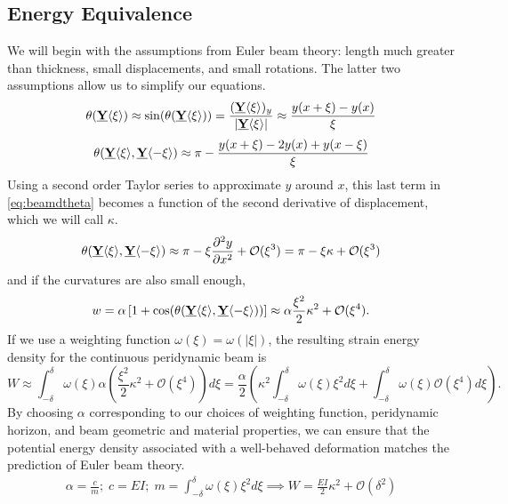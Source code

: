 \documentclass[11pt]{amsart}
\newcommand\vstate[3]{%
	\mathbf{\underline{#1}}%
	\ifstrempty{#2}{}{[#2]}%
	\ifstrempty{#3}{}{\langle #3 \rangle}}
\begin{document}
\subsection{Energy Equivalence}
%
We will begin with the assumptions from Euler beam theory: length much greater than thickness, small displacements, and small rotations. 
The latter two assumptions allow us to simplify our equations. 
%
\begin{equation}
\label{eq:beam}
\theta(\vstate{Y}{}{\xi})\approx \sin(\theta(\vstate{Y}{}{\xi})) = \frac{(\vstate{Y}{}{\xi})_y}{|\vstate{Y}{}{\xi}|} \approx \frac{y(x+\xi)-y(x)}{\xi}
\end{equation}
%
\begin{equation}
\label{eq:beamdtheta}
\theta(\vstate{Y}{}{\xi},\vstate{Y}{}{\mathbf{-\xi}}) \approx \pi-\frac{y(x+\xi)-2y(x)+y(x-\xi)}{\xi}
\end{equation}
%
Using a second order Taylor series to approximate $y$ around $x$, this last term in \cref{eq:beamdtheta} becomes a function of the second derivative of displacement, which we will call \(\kappa\).
%
\begin{equation}
\label{eq:beamdtheta2}
\theta(\vstate{Y}{}{\xi},\vstate{Y}{}{\mathbf{-\xi}}) \approx \pi-\xi \frac{\partial^2 y}{\partial x^2}+\mathcal{O}(\xi^3) =  \pi-\xi \kappa+\mathcal{O}(\xi^3) 
\end{equation}
%
and if the curvatures are also small enough,
%
\begin{align}
\label{eq:continuousBeamw}
w = \alpha \left[1+\cos(\theta(\vstate{Y}{}{\xi},\vstate{Y}{}{\mathbf{-\xi}})) \right] \approx \alpha\frac{\xi^2}{2}\kappa^2 +\mathcal{O}(\xi^4) .
\end{align}
%
If we use a weighting function \(\omega(\xi)=\omega(|\xi|)\), the resulting strain energy density for the continuous peridynamic beam is
%
\begin{equation}
W \approx \int_{-\delta}^\delta \omega(\xi)\alpha\left(\frac{\xi^2}{2}\kappa^2 +\mathcal{O}(\xi^4)\right) d\xi = \frac{\alpha}{2}\left(\kappa^2 \int_{-\delta}^\delta \omega(\xi)\xi^2 d\xi +\int_{-\delta}^\delta \omega(\xi)\mathcal{O}(\xi^4)d\xi\right) .
\end{equation}
%
By choosing \(\alpha\) corresponding to our choices of weighting function, peridynamic horizon, and beam geometric and material properties, we can ensure that the potential energy density associated with a well-behaved deformation matches the prediction of Euler beam theory.
%
\begin{align}
\label{eq:classicbeam}
\alpha = \frac{c}{m} ;\; c= EI ;\; m=\int_{-\delta}^\delta \omega(\xi)\xi^2 d\xi \implies W=\frac{EI}{2}\kappa^2+\mathcal{O}(\delta^2)
\end{align}
%
\end{document}
